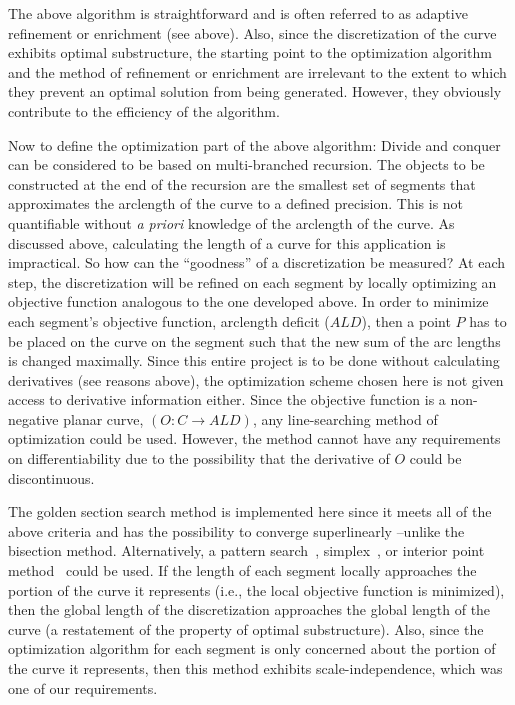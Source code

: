 The above algorithm is straightforward and is often referred to as 
adaptive refinement or enrichment (see above). Also, since the 
discretization of the curve exhibits optimal substructure, the starting 
point to the optimization algorithm and the method of refinement or 
enrichment are irrelevant to the extent to which they prevent an optimal 
solution from being generated. However, they obviously contribute 
to the efficiency of the algorithm.

Now to define the optimization part of the above algorithm: Divide and 
conquer can be considered to be based on multi-branched recursion. The 
objects to be constructed at the end of the recursion are the smallest set 
of segments that approximates the arclength of the curve to a defined 
precision. This is not quantifiable without {\it{a priori}} knowledge 
of the arclength of the curve. As discussed above, calculating the length 
of a curve for this application is impractical. So how can the 
``goodness'' of a discretization be measured?  At each step, the 
discretization will be refined on each segment by locally optimizing an 
objective function analogous to the one developed above. In order to 
minimize each segment's objective function, arclength deficit ($ALD$), 
then a point $P$ has to be placed on the curve on the segment such 
that the new sum of the arc lengths is changed maximally. Since this 
entire project is to be done without calculating derivatives (see reasons 
above), the optimization scheme chosen here is not given access to 
derivative information either. Since the objective function is a 
non-negative planar curve, $(O: C \rightarrow ALD)$, any line-searching 
method of optimization could be used. However, the method cannot have any 
requirements on differentiability due to the possibility that the 
derivative of $O$ could be discontinuous.

The golden section search method is implemented here since it meets all of 
the above criteria and has the possibility to converge superlinearly 
\cite{brent73}--unlike the bisection method.  Alternatively, a pattern 
search~\cite{hopspack}, simplex~\cite{dantzig1,dantzig2}, or interior 
point method~\cite{karmarkar} could be used.  If the length of each 
segment 
locally approaches the portion of the curve it represents (i.e., the 
local objective function is 
minimized), then the global length of the discretization approaches the 
global length of the curve (a restatement of the property of optimal 
substructure). Also, since the optimization algorithm for each segment is 
only concerned about the portion of the curve it represents, then this 
method exhibits scale-independence, which was one of our requirements.


